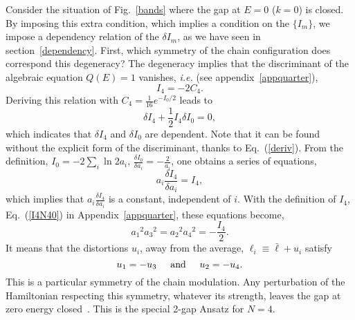 \documentclass[]{revtex4-1}
\begin{document}
Consider the situation of Fig.~\ref{bands} where the gap at $E=0$ ($k=0$) is closed. By imposing this extra condition, which implies a condition on the $\{I_m \}$, we impose a dependency relation of the $\delta I_m$, as we have seen in section~\ref{dependency}. First, which symmetry of the chain configuration does correspond this degeneracy? The degeneracy implies that the discriminant of the algebraic equation $Q(E)=1$ vanishes, \textit{i.e.} (see appendix~\ref{appquarter}), \begin{equation} I_4=-2C_4. \end{equation} Deriving this relation with $C_4=\frac{1}{16} e^{-I_0/2}$ leads to 
\begin{equation}
\delta I_4+ \frac{1}{2} I_4 \delta I_0 =0, \label{depN4}
\end{equation}
which indicates that $\delta I_4$ and $\delta I_0$ are dependent. Note that it can be found without the explicit form of the discriminant, thanks to Eq.~(\ref{deriv}).  From the definition, $I_0=-2 \sum_i \ln 2a_i$, $\frac{\delta I_0}{\delta a_i}=-\frac{2}{a_i}$, one  obtains a series of equations,
\begin{equation}
 a_i \frac{\delta I_4}{\delta a_i}=I_4,  \label{condN4}
\end{equation}
which implies that $a_i \frac{\delta I_4}{\delta a_i}$ is a constant, independent of $i$. 
With the definition of $I_4$, Eq.~(\ref{I4N40}) in Appendix~\ref{appquarter}, these equations become,
\begin{equation}
{a_1}^2{a_3}^2 = {a_2}^2{a_4}^2= -\frac{I_4}{2}. \label{symN4}
\end{equation}
It means that the distortions $u_i$, away from the average, $\ell_i \equiv \bar{\ell}+u_i$ satisfy \begin{equation} u_1=-u_3 \hspace{.5cm} \mbox{and} \hspace{.5cm} u_2=-u_4. \end{equation} This is  a particular symmetry of the chain modulation. Any perturbation of the Hamiltonian respecting this symmetry, whatever its strength, leaves the gap at zero energy closed~\cite{notekdv}. This is the special 2-gap Ansatz for $N=4$.
\end{document}
